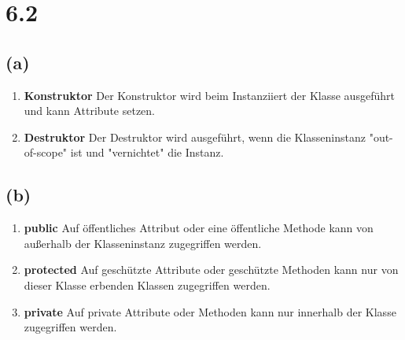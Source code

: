 \section*{6.2}
\subsection*{(a)}
\begin{enumerate}
\item \textbf{Konstruktor} Der Konstruktor wird beim Instanziiert der Klasse ausgeführt und kann Attribute setzen.
\item \textbf{Destruktor} Der Destruktor wird ausgeführt, wenn die Klasseninstanz "out-of-scope" ist und "vernichtet" die Instanz.
\end{enumerate}

\subsection*{(b)}
\begin{enumerate}
\item \textbf{public} Auf öffentliches Attribut oder eine öffentliche Methode kann von außerhalb der Klasseninstanz zugegriffen werden.
\item \textbf{protected} Auf geschützte Attribute oder geschützte Methoden kann nur von dieser Klasse erbenden Klassen zugegriffen werden.
\item \textbf{private} Auf private Attribute oder Methoden kann nur innerhalb der Klasse zugegriffen werden.
\end{enumerate}